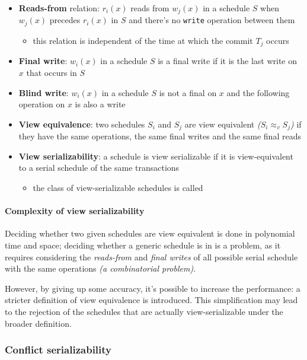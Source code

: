\documentclass[english]{article}
\begin{document}
\begin{itemize}
  \item \textbf{Reads-from} relation: \(r_i(x)\) reads from \(w_j(x)\) in a schedule \(S\) when \(w_j(x)\) precedes \(r_i(x)\) in \(S\) and there's no \texttt{write} operation between them
        \begin{itemize}
          \item this relation is independent of the time at which the commit \(T_j\) occurs
        \end{itemize}
  \item \textbf{Final write}: \(w_i(x)\) in a schedule \(S\) is a final write if it is the last write on \(x\) that occurs in \(S\)
  \item \textbf{Blind write}: \(w_i(x)\) in a schedule \(S\) is not a final on \(x\) and the following operation on \(x\) is also a write
  \item \textbf{View equivalence}: two schedules \(S_i\) and \(S_j\) are view equivalent \textit{(\(S_i \approx_v S_j\))} if they have the same operations, the same final writes and the same final reads
  \item \textbf{View serializability}: a schedule is view serializable if it is view-equivalent to a serial schedule of the same transactions
        \begin{itemize}
          \item the class of view-serializable schedules is called \VSR
        \end{itemize}
\end{itemize}

\paragraph{Complexity of view serializability}

Deciding whether two given schedules are view equivalent is done in polynomial time and space;
deciding whether a generic schedule is in \VSR is a \NPC problem, as it requires considering the \textit{reads-from} and \textit{final writes} of all possible serial schedule with the same operations \textit{(a combinatorial problem)}.

However, by giving up some accuracy, it's possible to increase the performance: a stricter definition of view equivalence is introduced.
This simplification may lead to the rejection of the schedules that are actually view-serializable under the broader definition.

\subsubsection{Conflict serializability}
\end{document}
